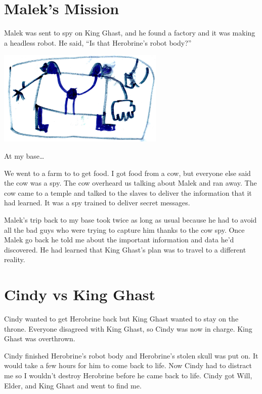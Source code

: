 \documentclass[12pt,twoside]{krantz}
\begin{document}
\hypertarget{maleks-mission}{%
\section{Malek's Mission}\label{maleks-mission}}

Malek was sent to spy on King Ghast, and he found a factory and it was
making a headless robot. He said, ``Is that Herobrine's robot body?''

\includegraphics[width=3.125in,height=\textheight]{img/king-ghast/10-herobrine.jpg}

At my base\ldots{}

We went to a farm to to get food. I got food from a cow, but everyone
else said the cow was a spy. The cow overheard us talking about Malek
and ran away. The cow came to a temple and talked to the slaves to
deliver the information that it had learned. It was a spy trained to
deliver secret messages.

Malek's trip back to my base took twice as long as usual because he had
to avoid all the bad guys who were trying to capture him thanks to the
cow spy. Once Malek go back he told me about the important information
and data he'd discovered. He had learned that King Ghast's plan was to
travel to a different reality.

\hypertarget{cindy-vs-king-ghast}{%
\section{Cindy vs King Ghast}\label{cindy-vs-king-ghast}}

Cindy wanted to get Herobrine back but King Ghast wanted to stay on the
throne. Everyone disagreed with King Ghast, so Cindy was now in charge.
King Ghast was overthrown.

Cindy finished Herobrine's robot body and Herobrine's stolen skull was
put on. It would take a few hours for him to come back to life. Now
Cindy had to distract me so I wouldn't destroy Herobrine before he came
back to life. Cindy got Will, Elder, and King Ghast and went to find me.
\end{document}
